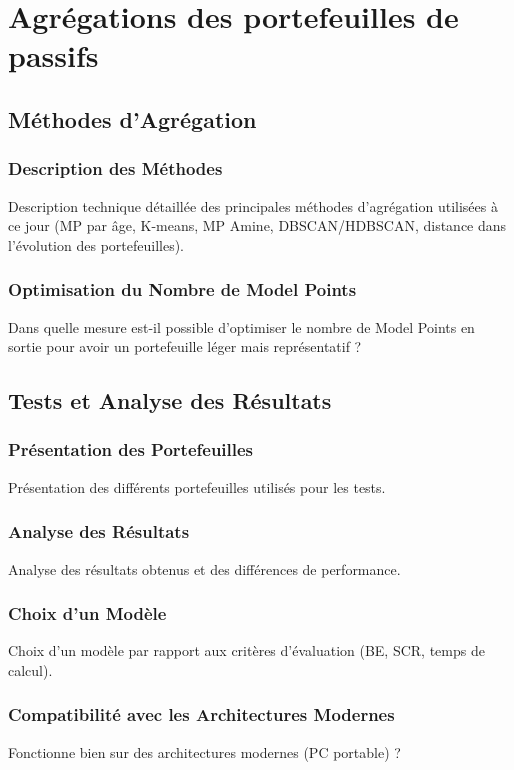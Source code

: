 \chapter{Agrégations des portefeuilles de passifs}
\section{Méthodes d'Agrégation}
\subsection{Description des Méthodes}
Description technique détaillée des principales méthodes d'agrégation utilisées à ce jour (MP par âge, K-means, MP Amine, DBSCAN/HDBSCAN, distance dans l'évolution des portefeuilles).

\subsection{Optimisation du Nombre de Model Points}
Dans quelle mesure est-il possible d’optimiser le nombre de Model Points en sortie pour avoir un portefeuille léger mais représentatif ?

\section{Tests et Analyse des Résultats}
\subsection{Présentation des Portefeuilles}
Présentation des différents portefeuilles utilisés pour les tests.

\subsection{Analyse des Résultats}
Analyse des résultats obtenus et des différences de performance.

\subsection{Choix d'un Modèle}
Choix d'un modèle par rapport aux critères d'évaluation (BE, SCR, temps de calcul).

\subsection{Compatibilité avec les Architectures Modernes}
Fonctionne bien sur des architectures modernes (PC portable) ?